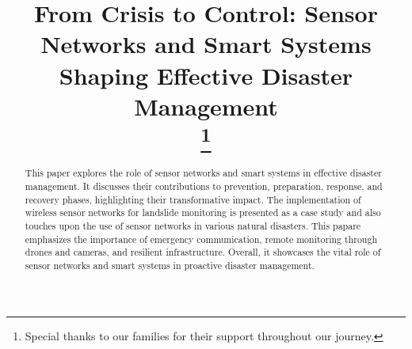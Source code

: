 \documentclass[conference]{IEEEtran}
\begin{document}
\title{From Crisis to Control: Sensor Networks and Smart Systems Shaping Effective Disaster Management \\
    \thanks{Special thanks to our families for their support throughout our journey.}
}

\author{
}

\maketitle

\begin{abstract}

This paper explores the role of sensor networks and smart systems in effective disaster management. 
It discusses their contributions to prevention, preparation, response, and recovery phases, highlighting 
their transformative impact. The implementation of wireless sensor networks for landslide monitoring is 
presented as a case study and also touches upon the use of sensor networks in various natural 
disasters. This papare emphasizes the importance of emergency communication, remote monitoring through drones 
and cameras, and resilient infrastructure. Overall, it showcases the vital role of sensor networks and 
smart systems in proactive disaster management.\par

\end{abstract}
\end{document}
